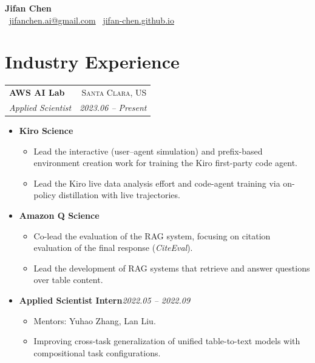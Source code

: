 \documentclass[11pt,letterpaper]{article}
\makeatletter
\newcommand{\entry}[4]{%
  \begin{tabularx}{\textwidth}{@{}X r@{}}
    \textbf{#1} & \textsc{\small\color{gray}#2}\\
    \emph{#3}   & \emph{\small\color{gray}#4}\\
  \end{tabularx}%
  \vspace{2pt}%
}
\newenvironment{tightlist}
  {\begin{itemize}[leftmargin=1.4em,topsep=2pt,itemsep=1pt,parsep=0pt]}
  {\end{itemize}}
\makeatother
\begin{document}
\begin{center}
  {\Huge\bfseries Jifan Chen}\\[6pt]
  {\small\color{gray}
    \faEnvelope\ \href{mailto:jifanchen.ai@gmail.com}{jifanchen.ai@gmail.com}
    \quad\textbar\quad
    \faGlobe\ \href{https://jifan-chen.github.io/}{jifan-chen.github.io}
  }
\end{center}
\vspace{4pt}

\section{Industry Experience}

\entry{AWS AI Lab}{Santa Clara, US}{Applied Scientist}{2023.06 -- Present}
\begin{tightlist}
  \item[] \textbf{Kiro Science}
  \begin{tightlist}
    \item Lead the interactive (user--agent simulation) and prefix-based environment
          creation work for training the Kiro first-party code agent.
    \item Lead the Kiro live data analysis effort and code-agent training via on-policy
          distillation with live trajectories.
  \end{tightlist}
  \item[] \textbf{Amazon Q Science}
  \begin{tightlist}
    \item Co-lead the evaluation of the RAG system, focusing on citation evaluation of the
          final response (\emph{CiteEval}).
    \item Lead the development of RAG systems that retrieve and answer questions over
          table content.
  \end{tightlist}
  \item[] \textbf{Applied Scientist Intern}\hfill\emph{\small\color{gray}2022.05 -- 2022.09}
  \begin{tightlist}
    \item Mentors: Yuhao Zhang, Lan Liu.
    \item Improving cross-task generalization of unified table-to-text models with
          compositional task configurations.
  \end{tightlist}
\end{tightlist}
\vspace{4pt}
\end{document}
